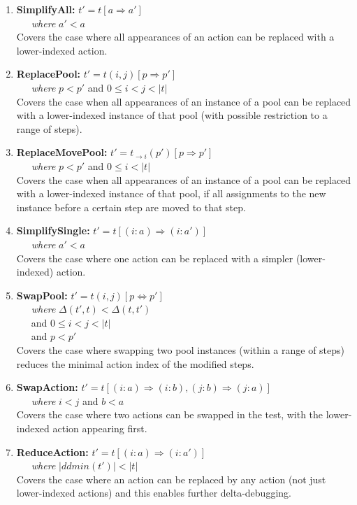 \begin{enumerate}
\item {\bf SimplifyAll:}
$t' = t[a \Rightarrow a']$\\
\-\ \ \ \emph{where} $a' < a$\\
Covers the case where all appearances of an action can be replaced with a 
lower-indexed action. 
\item {\bf ReplacePool:}
$t' = t(i,j)[p \Rightarrow p']$\\ 
\-\ \ \ \emph{where} $p < p'$ and $0 \leq i < j <
|t|$\\
Covers the case when all appearances of an instance of a pool can be replaced with 
a lower-indexed instance of that pool (with possible restriction to a range of steps).
\item {\bf ReplaceMovePool:}
$t' = t_{\rightarrow i}(p')[p \Rightarrow p']$\\
\-\ \ \ \emph{where} $p < p'$ and $0
\leq i < |t|$\\
Covers the case when all appearances of an instance of a pool can be replaced with
a lower-indexed instance of that pool, if all assignments to the new instance before a
certain step are moved to that step.
\item {\bf SimplifySingle:}
$t' = t[(i: a) \Rightarrow (i: a')]$\\
\-\ \ \ \emph{where} $a' < a$\\
Covers the case where one action can be replaced with a 
simpler (lower-indexed) action. 
\item {\bf SwapPool:}
$t' = t(i,j)[p \Leftrightarrow p']$\\
\-\ \ \ \emph{where} $\Delta(t',t) < \Delta(t,t')$\\
\-\ \ \ and $0 \leq i < j < |t|$\\
\-\ \ \ and $p < p'$\\
Covers the case where swapping two pool instances (within a range of steps) reduces
the minimal action index of the modified steps.
\item {\bf SwapAction:}
$t' = t[(i: a) \Rightarrow (i: b), (j: b) \Rightarrow (j: a)]$\\
\-\ \ \ \emph{where} $i < j$ and
$b < a$\\
Covers the case where two actions can be swapped in the test, with the
lower-indexed action appearing first.
\item {\bf ReduceAction:}
$t' = t[(i: a) \Rightarrow (i: a')]$\\
\-\ \ \ \emph{where} $|ddmin(t')| < |t|$\\
Covers the case where an action can be replaced by any action (not just lower-indexed
actions) and this enables further delta-debugging.
\end{enumerate}

